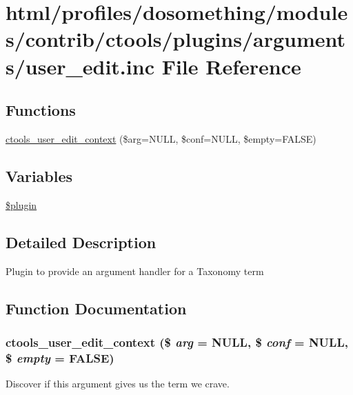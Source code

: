\hypertarget{plugins_2arguments_2user__edit_8inc}{
\section{html/profiles/dosomething/modules/contrib/ctools/plugins/arguments/user\_\-edit.inc File Reference}
\label{plugins_2arguments_2user__edit_8inc}
}
\subsection*{Functions}
\begin{DoxyCompactItemize}
\item 
\hyperlink{plugins_2arguments_2user__edit_8inc_a150115991b4b933d858834ae9c2fc5ec}{ctools\_\-user\_\-edit\_\-context} (\$arg=NULL, \$conf=NULL, \$empty=FALSE)
\end{DoxyCompactItemize}
\subsection*{Variables}
\begin{DoxyCompactItemize}
\item 
\hyperlink{plugins_2arguments_2user__edit_8inc_ada8a7130088351710bb02ed622d6bf65}{\$plugin}
\end{DoxyCompactItemize}


\subsection{Detailed Description}
Plugin to provide an argument handler for a Taxonomy term 

\subsection{Function Documentation}
\hypertarget{plugins_2arguments_2user__edit_8inc_a150115991b4b933d858834ae9c2fc5ec}{
\subsubsection[{ctools\_\-user\_\-edit\_\-context}]{\setlength{\rightskip}{0pt plus 5cm}ctools\_\-user\_\-edit\_\-context (\$ {\em arg} = {\ttfamily NULL}, \/  \$ {\em conf} = {\ttfamily NULL}, \/  \$ {\em empty} = {\ttfamily FALSE})}}
\label{plugins_2arguments_2user__edit_8inc_a150115991b4b933d858834ae9c2fc5ec}
Discover if this argument gives us the term we crave. 

